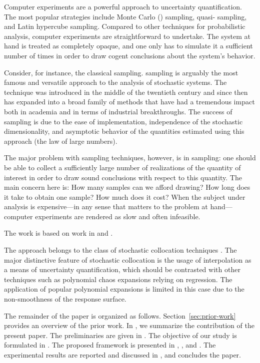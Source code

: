 Computer experiments \cite{santner2003} are a powerful approach to uncertainty
quantification. The most popular strategies include Monte Carlo ()
sampling, quasi- sampling, and Latin hypercube sampling. Compared to
other techniques for probabilistic analysis, computer experiments are
straightforward to undertake. The system at hand is treated as completely
opaque, and one only has to simulate it a sufficient number of times in order to
draw cogent conclusions about the system's behavior.

Consider, for instance, the classical  sampling.  sampling is
arguably the most famous and versatile approach to the analysis of stochastic
systems. The technique was introduced in the middle of the twentieth century and
since then has expanded into a broad family of methods that have had a
tremendous impact both in academia and in terms of industrial breakthroughs. The
success of  sampling is due to the ease of implementation, independence
of the stochastic dimensionality, and asymptotic behavior of the quantities
estimated using this approach (the law of large numbers).

The major problem with sampling techniques, however, is in sampling: one should
be able to collect a sufficiently large number of realizations of the quantity
of interest in order to draw sound conclusions with respect to this quantity.
The main concern here is: How many samples can we afford drawing? How long does
it take to obtain one sample? How much does it cost? When the subject under
analysis is expensive---in any sense that matters to the problem at
hand---computer experiments are rendered as slow and often infeasible.

The work is based on work in \cite{klimke2006} and \cite{ma2009}.

The approach belongs to the class of stochastic collocation techniques
\cite{xiu2010}. The major distinctive feature of stochastic collocation is the
usage of interpolation as a means of uncertainty quantification, which should be
contrasted with other techniques such as polynomial chaos expansions relying on
regression. The application of popular polynomial expansions is limited in this
case due to the non-smoothness of the response surface.

The remainder of the paper is organized as follows. Section~\ref{sec:prior-work}
provides an overview of the prior work. In , we summarize the
contribution of the present paper. The preliminaries are given in
. The objective of our study is formulated in
. The proposed framework is presented in
, , and . The experimental
results are reported and discussed in , and
 concludes the paper.
